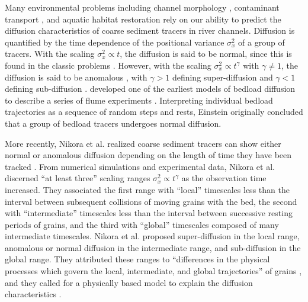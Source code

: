 \documentclass[grl]{agujournal2018}
\begin{document}
Many environmental problems including channel morphology \citep{Hassan2017}, contaminant transport \citep{Macklin2006}, and aquatic habitat restoration \citep{Gaeuman2017} rely on our ability to predict the diffusion characteristics of coarse sediment tracers in river channels.
Diffusion is quantified by the time dependence of the positional variance $\sigma_x^2$ of a group of tracers.
With the scaling $\sigma_x^2 \propto t$, the diffusion is said to be normal, since this is found in the classic problems \citep{Taylor1920}.
However, with the scaling $\sigma_x^2 \propto t^\gamma$ with $\gamma \neq 1$, the diffusion is said to be anomalous \citep{Sokolov2012}, with $\gamma>1$ defining super-diffusion and $\gamma<1$ defining sub-diffusion \citep{Metzler2000}.
\citet{Einstein1937} developed one of the earliest models of bedload diffusion to describe a series of flume experiments \citep{Ettema2014}.
Interpreting individual bedload trajectories as a sequence of random steps and rests, Einstein originally concluded that a group of bedload tracers undergoes normal diffusion.

More recently, Nikora et al. realized coarse sediment tracers can show either normal or anomalous diffusion depending on the length of time they have been tracked \citep{Nikora2001a,Nikora2002}.
From numerical simulations and experimental data, Nikora et al. discerned ``at least three'' scaling ranges $\sigma_x^2 \propto t^\gamma$ as the observation time increased.
They associated the first range with ``local'' timescales less than the interval between subsequent collisions of moving grains with the bed, the second with ``intermediate'' timescales less than the interval between successive resting periods of grains, and the third with ``global'' timescales composed of many intermediate timescales.
Nikora et al. proposed super-diffusion in the local range, anomalous or normal diffusion in the intermediate range, and sub-diffusion in the global range.
They attributed these ranges to ``differences in the physical processes which govern the local, intermediate, and global trajectories'' of grains \citep{Nikora2001a}, and they called for a physically based model to explain the diffusion characteristics \citep{Nikora2002}.
\end{document}
